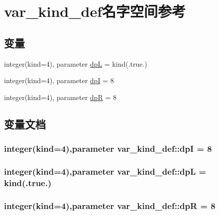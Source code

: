 \hypertarget{namespacevar__kind__def}{
\section{var\_\-kind\_\-def名字空间参考}
\label{namespacevar__kind__def}
}
\subsection*{变量}
\begin{DoxyCompactItemize}
\item 
integer(kind=4), parameter \hyperlink{namespacevar__kind__def_aa3b5571c2174e959545aafa1bd3fdaa8}{dpL} = kind(.true.)
\item 
integer(kind=4), parameter \hyperlink{namespacevar__kind__def_adb3c90c729c1d40f3dfd28e762aa2b02}{dpI} = 8
\item 
integer(kind=4), parameter \hyperlink{namespacevar__kind__def_a6f4f33a8b11a152a821a0ee8b1d6fa69}{dpR} = 8
\end{DoxyCompactItemize}


\subsection{变量文档}
\hypertarget{namespacevar__kind__def_adb3c90c729c1d40f3dfd28e762aa2b02}{
\subsubsection[{dpI}]{\setlength{\rightskip}{0pt plus 5cm}integer(kind=4),parameter {\bf var\_\-kind\_\-def::dpI} = 8}}
\label{namespacevar__kind__def_adb3c90c729c1d40f3dfd28e762aa2b02}
\hypertarget{namespacevar__kind__def_aa3b5571c2174e959545aafa1bd3fdaa8}{
\subsubsection[{dpL}]{\setlength{\rightskip}{0pt plus 5cm}integer(kind=4),parameter {\bf var\_\-kind\_\-def::dpL} = kind(.true.)}}
\label{namespacevar__kind__def_aa3b5571c2174e959545aafa1bd3fdaa8}
\hypertarget{namespacevar__kind__def_a6f4f33a8b11a152a821a0ee8b1d6fa69}{
\subsubsection[{dpR}]{\setlength{\rightskip}{0pt plus 5cm}integer(kind=4),parameter {\bf var\_\-kind\_\-def::dpR} = 8}}
\label{namespacevar__kind__def_a6f4f33a8b11a152a821a0ee8b1d6fa69}
